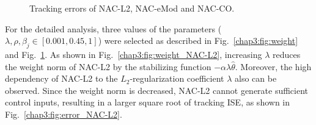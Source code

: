 \begin{figure}[!t]      
    \centering
    \vfill
    \vfill
    \vfill
    \caption{Tracking errors of NAC-L2, NAC-eMod and NAC-CO.}
    \label{chap3:fig:error}
\end{figure}

For the detailed analysis, three values of the parameters (\ie $\lambda,\rho,\beta_j\in[0.001,0.45,1] \allowbreak $) were selected as described in Fig.~\ref{chap3:fig:weight} and Fig.~\ref{chap3:fig:error}.
As shown in Fig.~\ref{chap3:fig:weight_NAC-L2}, increasing $\lambda$ reduces the weight norm of NAC-L2 by the stabilizing function $-\alpha\lambda\hat\theta$.
Moreover, the high dependency of NAC-L2 to the $L_2$-regularization coefficient $\lambda$ also can be observed.
Since the weight norm is decreased, NAC-L2 cannot generate sufficient control inputs, resulting in a larger square root of tracking ISE, as shown in Fig.~\ref{chap3:fig:error_NAC-L2}.

